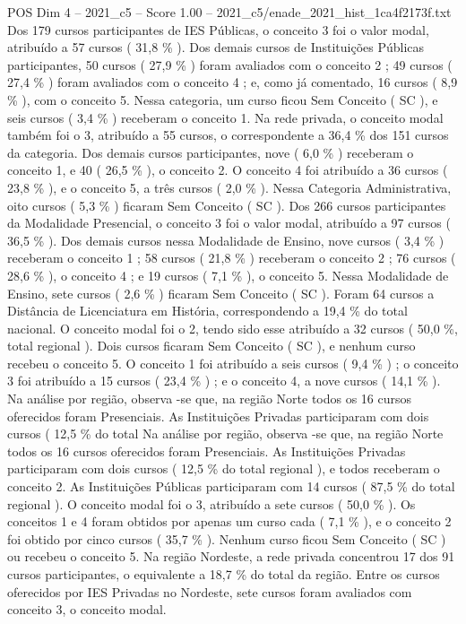 \begin{textsample}{POS Dim 4 – 2021\_c5 – Score 1.00 – 2021\_c5/enade\_2021\_hist\_1ca4f2173f.txt}
Dos 179 cursos participantes de IES Públicas, o conceito 3 foi o valor modal, atribuído a 57 cursos ( 31,8 \% ).
Dos demais cursos de Instituições Públicas participantes, 50 cursos ( 27,9 \% ) foram avaliados com o conceito 2 ; 49 cursos ( 27,4 \% ) foram avaliados com o conceito 4 ; e, como já comentado, 16 cursos ( 8,9 \% ), com o conceito 5.
Nessa categoria, um curso ficou Sem Conceito ( SC ), e seis cursos ( 3,4 \% ) receberam o conceito 1.
Na rede privada, o conceito modal também foi o 3, atribuído a 55 cursos, o correspondente a 36,4 \% dos 151 cursos da categoria.
Dos demais cursos participantes, nove ( 6,0 \% ) receberam o conceito 1, e 40 ( 26,5 \% ), o conceito 2.
O conceito 4 foi atribuído a 36 cursos ( 23,8 \% ), e o conceito 5, a três cursos ( 2,0 \% ).
Nessa Categoria Administrativa, oito cursos ( 5,3 \% ) ficaram Sem Conceito ( SC ).
Dos 266 cursos participantes da Modalidade Presencial, o conceito 3 foi o valor modal, atribuído a 97 cursos ( 36,5 \% ).
Dos demais cursos nessa Modalidade de Ensino, nove cursos ( 3,4 \% ) receberam o conceito 1 ; 58 cursos ( 21,8 \% ) receberam o conceito 2 ; 76 cursos ( 28,6 \% ), o conceito 4 ; e 19 cursos ( 7,1 \% ), o conceito 5.
Nessa Modalidade de Ensino, sete cursos ( 2,6 \% ) ficaram Sem Conceito ( SC ).
Foram 64 cursos a Distância de Licenciatura em História, correspondendo a 19,4 \% do total nacional.
O conceito modal foi o 2, tendo sido esse atribuído a 32 cursos ( 50,0 \%, total regional ).
Dois cursos ficaram Sem Conceito ( SC ), e nenhum curso recebeu o conceito 5.
O conceito 1 foi atribuído a seis cursos ( 9,4 \% ) ; o conceito 3 foi atribuído a 15 cursos ( 23,4 \% ) ; e o conceito 4, a nove cursos ( 14,1 \% ).
Na análise por região, observa -se que, na região Norte todos os 16 cursos oferecidos foram Presenciais.
As Instituições Privadas participaram com dois cursos ( 12,5 \% do total Na análise por região, observa -se que, na região Norte todos os 16 cursos oferecidos foram Presenciais.
As Instituições Privadas participaram com dois cursos ( 12,5 \% do total regional ), e todos receberam o conceito 2.
As Instituições Públicas participaram com 14 cursos ( 87,5 \% do total regional ).
O conceito modal foi o 3, atribuído a sete cursos ( 50,0 \% ).
Os conceitos 1 e 4 foram obtidos por apenas um curso cada ( 7,1 \% ), e o conceito 2 foi obtido por cinco cursos ( 35,7 \% ).
Nenhum curso ficou Sem Conceito ( SC ) ou recebeu o conceito 5.
Na região Nordeste, a rede privada concentrou 17 dos 91 cursos participantes, o equivalente a 18,7 \% do total da região.
Entre os cursos oferecidos por IES Privadas no Nordeste, sete cursos foram avaliados com conceito 3, o conceito modal.

\end{textsample}
